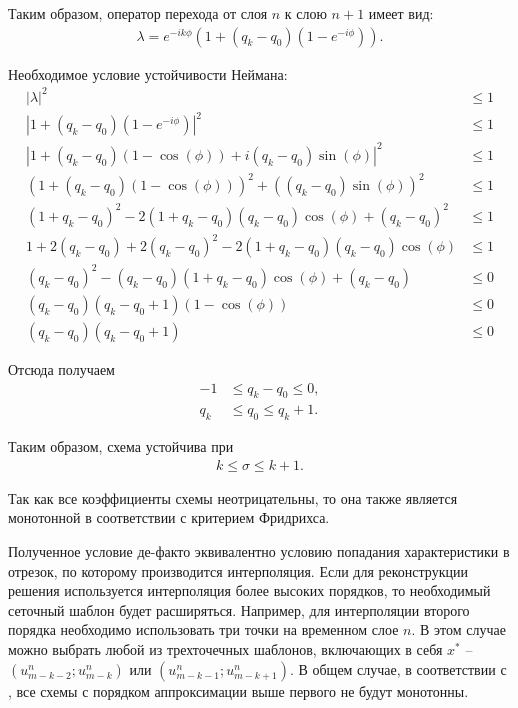 Таким образом, оператор перехода от слоя $n$ к слою $n+1$ имеет вид:
\begin{align}
\lambda = e^{-ik\phi} ( 1 + (q_k - q_0) (1 - e^{-i\phi}) ).
\end{align}

Необходимое условие устойчивости Неймана:
\begin{align}
|\lambda|^2 &\le 1 \nonumber\\
| 1 + (q_k - q_0) (1 - e^{-i\phi}) |^2 &\le 1 \nonumber\\
| 1 + (q_k - q_0) (1 - \cos(\phi)) + i(q_k - q_0)\sin(\phi) |^2 &\le 1 \nonumber\\
( 1 + (q_k - q_0) (1 - \cos(\phi)))^2 + ((q_k - q_0)\sin(\phi))^2 &\le 1 \nonumber\\
( 1 + q_k - q_0)^2 - 2 ( 1 + q_k - q_0)(q_k - q_0) \cos(\phi) + (q_k - q_0)^2 &\le 1 \nonumber\\
1 + 2 (q_k - q_0) + 2 (q_k - q_0)^2 - 2 ( 1 + q_k - q_0)(q_k - q_0) \cos(\phi) &\le 1 \nonumber\\
(q_k - q_0)^2 - (q_k - q_0) ( 1 + q_k - q_0 ) \cos(\phi) + (q_k - q_0) &\le 0 \nonumber\\
(q_k - q_0)(q_k - q_0 + 1)(1 - \cos(\phi)) &\le 0 \nonumber\\
(q_k - q_0)(q_k - q_0 + 1) &\le 0
\end{align}

Отсюда получаем
\begin{align}
-1 &\le q_k - q_0 \le 0,  \nonumber\\
q_k &\le q_0 \le q_k + 1.
\end{align}

Таким образом, схема устойчива при 
\begin{align}
k \le \sigma \le k+1.
\end{align}

Так как все коэффициенты схемы неотрицательны, то она также является монотонной в соответствии с критерием Фридрихса.

Полученное условие де-факто эквивалентно условию попадания характеристики в отрезок, по которому производится интерполяция. Если для реконструкции решения используется интерполяция более высоких порядков, то необходимый сеточный шаблон будет расширяться. Например, для интерполяции второго порядка необходимо использовать три точки на временном слое $n$. В этом случае можно выбрать любой из трехточечных шаблонов, включающих в себя $x^*$ -- $(u_{m-k-2}^n; u_{m-k}^n)$ или $(u_{m-k-1}^n; u_{m-k+1}^n)$. В общем случае, в соответствии с \cite{magomedov}, все схемы с порядком аппроксимации выше первого не будут монотонны.

